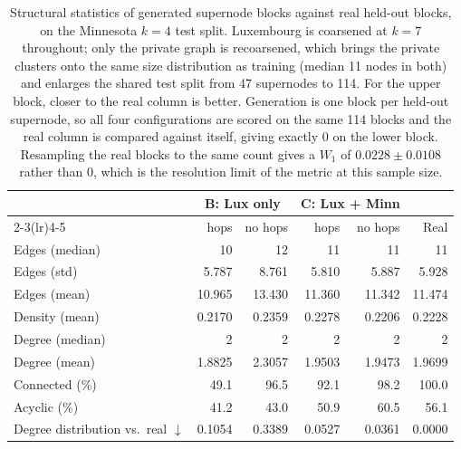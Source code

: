 
\begin{table}[H]
\centering
\caption{Structural statistics of generated supernode blocks against real
held-out blocks, on the Minnesota $k{=}4$ test split. Luxembourg is coarsened at
$k{=}7$ throughout; only the private graph is recoarsened, which brings the
private clusters onto the same size distribution as training (median 11 nodes in
both) and enlarges the shared test split from 47 supernodes to 114. For the upper
block, closer to the real column is better. Generation is one block per held-out
supernode, so all four configurations are scored on the same 114 blocks and the
real column is compared against itself, giving exactly $0$ on the lower block.
Resampling the real blocks to the same count gives a $W_1$ of
$0.0228 \pm 0.0108$ rather than $0$, which is the resolution limit of the metric
at this sample size.}\label{tab:dintra-k4-stats}
\begin{tabular}{lrrrrr}
\toprule
& \multicolumn{2}{c}{B: Lux only} & \multicolumn{2}{c}{C: Lux + Minn} & \\
\cmidrule(lr){2-3}\cmidrule(lr){4-5}
& hops & no hops & hops & no hops & Real \\
\midrule
Edges (median)                             & 10     & 12     & 11     & 11     & 11 \\
Edges (std)                                & 5.787  & 8.761  & 5.810  & 5.887  & 5.928 \\
Edges (mean)                               & 10.965 & 13.430 & 11.360 & 11.342 & 11.474 \\
Density (mean)                             & 0.2170 & 0.2359 & 0.2278 & 0.2206 & 0.2228 \\
Degree (median)                            & 2      & 2      & 2      & 2      & 2 \\
Degree (mean)                              & 1.8825 & 2.3057 & 1.9503 & 1.9473 & 1.9699 \\
Connected (\%)                             & 49.1   & 96.5   & 92.1   & 98.2   & 100.0 \\
Acyclic (\%)                               & 41.2   & 43.0   & 50.9   & 60.5   & 56.1 \\
\midrule
Degree distribution vs.\ real $\downarrow$ & 0.1054 & 0.3389 & 0.0527 & 0.0361 & 0.0000 \\
\bottomrule
\end{tabular}
\end{table}


